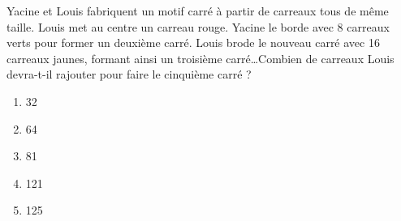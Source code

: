 Yacine et Louis fabriquent un motif carré à partir de carreaux tous de même taille. Louis met au centre un carreau rouge. Yacine le borde avec 8 carreaux verts pour former un deuxième carré. Louis brode le nouveau carré avec 16 carreaux jaunes, formant ainsi un troisième carré\ldots Combien de carreaux Louis devra-t-il rajouter pour faire le cinquième carré ?
\begin{multicols}{5}
  \begin{enumerate}[A/]
  \item 32
  \item 64
  \item 81
  \item 121
  \item 125
  \end{enumerate}
\end{multicols}